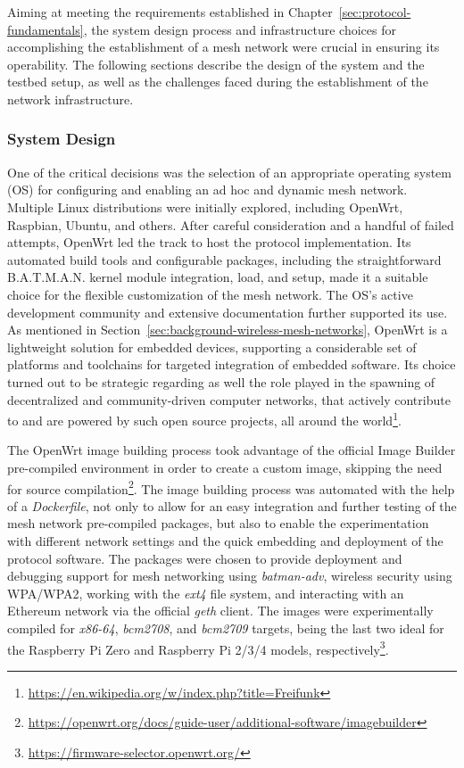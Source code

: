 Aiming at meeting the requirements established in Chapter~\ref{sec:protocol-fundamentals}, the system design process and infrastructure choices for accomplishing the establishment of a mesh network were crucial in ensuring its operability. The following sections describe the design of the system and the testbed setup, as well as the challenges faced during the establishment of the network infrastructure.

\subsubsection{System Design} \label{sec:infrastructure}

One of the critical decisions was the selection of an appropriate operating system (OS) for configuring and enabling an ad hoc and dynamic mesh network. Multiple Linux distributions were initially explored, including OpenWrt, Raspbian, Ubuntu, and others. After careful consideration and a handful of failed attempts, OpenWrt led the track to host the protocol implementation. Its automated build tools and configurable packages, including the straightforward B.A.T.M.A.N. kernel module integration, load, and setup, made it a suitable choice for the flexible customization of the mesh network. The OS's active development community and extensive documentation further supported its use. As mentioned in Section~\ref{sec:background-wireless-mesh-networks}, OpenWrt is a lightweight solution for embedded devices, supporting a considerable set of platforms and toolchains for targeted integration of embedded software. Its choice turned out to be strategic regarding as well the role played in the spawning of decentralized and community-driven computer networks, that actively contribute to and are powered by such open source projects, all around the world\footnote{\url{https://en.wikipedia.org/w/index.php?title=Freifunk}}.

The OpenWrt image building process took advantage of the official Image Builder pre-compiled environment in order to create a custom image, skipping the need for source compilation\footnote{\url{https://openwrt.org/docs/guide-user/additional-software/imagebuilder}}. The image building process was automated with the help of a \emph{Dockerfile}, not only to allow for an easy integration and further testing of the mesh network pre-compiled packages, but also to enable the experimentation with different network settings and the quick embedding and deployment of the \pol{} protocol software. The packages were chosen to provide deployment and debugging support for mesh networking using \emph{batman-adv}, wireless security using WPA/WPA2, working with the \emph{ext4} file system, and interacting with an Ethereum network via the official \emph{geth} client. The images were experimentally compiled for \emph{x86-64}, \emph{bcm2708}, and \emph{bcm2709} targets, being the last two ideal for the Raspberry Pi Zero and Raspberry Pi 2/3/4 models, respectively\footnote{\url{https://firmware-selector.openwrt.org/}}.

